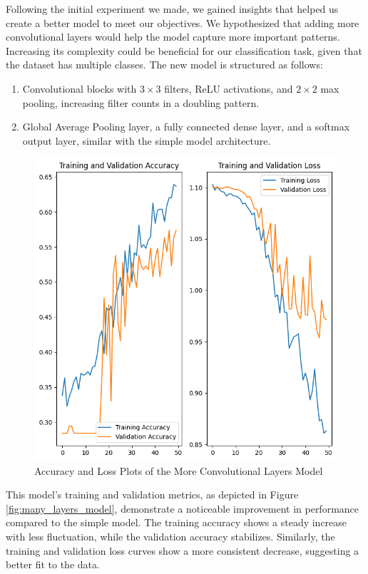 Following the initial experiment we made, we gained insights that helped us create a better model to meet our objectives. We hypothesized that adding more convolutional layers would help the model capture more important patterns. Increasing its complexity could be beneficial for our classification task, given that the dataset has multiple classes. The new model is structured as follows:

\begin{enumerate}
  \item Convolutional blocks with \(3 \times 3\) filters, ReLU activations, and \(2 \times 2\) max pooling, increasing filter counts in a doubling pattern.
  \item Global Average Pooling layer, a fully connected dense layer, and a softmax output layer, similar with the simple model architecture.
\end{enumerate}

\begin{figure}[H]
  \includegraphics[width=\linewidth]{figures/many_layers.png}
  \caption{Accuracy and Loss Plots of the More Convolutional Layers Model}
  \label{fig:many_layers}
\end{figure}

This model's training and validation metrics, as depicted in Figure \ref{fig:many_layers_model}, demonstrate a noticeable improvement in performance compared to the simple model. The training accuracy shows a steady increase with less fluctuation, while the validation accuracy stabilizes. Similarly, the training and validation loss curves show a more consistent decrease, suggesting a better fit to the data.

